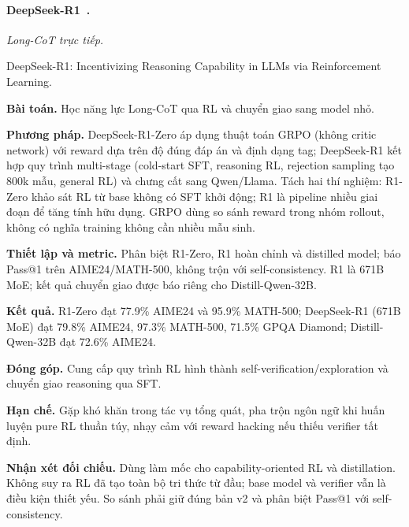 \begin{samepage}
\paragraph{DeepSeek-R1~\cite{rra1_deepseek_r1}.}
\emph{Long-CoT trực tiếp.}\par
{\raggedright\noindent\small DeepSeek-R1: Incentivizing Reasoning Capability in LLMs via Reinforcement Learning.\par}
\noindent\textbf{Bài toán.} Học năng lực Long-CoT qua RL và chuyển giao sang model nhỏ.\par
\end{samepage}
\noindent\textbf{Phương pháp.} DeepSeek-R1-Zero áp dụng thuật toán GRPO (không critic network) với reward dựa trên độ đúng đáp án và định dạng tag; DeepSeek-R1 kết hợp quy trình multi-stage (cold-start SFT, reasoning RL, rejection sampling tạo 800k mẫu, general RL) và chưng cất sang Qwen/Llama. Tách hai thí nghiệm: R1-Zero khảo sát RL từ base không có SFT khởi động; R1 là pipeline nhiều giai đoạn để tăng tính hữu dụng. GRPO dùng so sánh reward trong nhóm rollout, không có nghĩa training không cần nhiều mẫu sinh.\par
\noindent\textbf{Thiết lập và metric.} Phân biệt R1-Zero, R1 hoàn chỉnh và distilled model; báo Pass@1 trên AIME24/MATH-500, không trộn với self-consistency. R1 là 671B MoE; kết quả chuyển giao được báo riêng cho Distill-Qwen-32B.\par
\noindent\textbf{Kết quả.} R1-Zero đạt 77.9\% AIME24 và 95.9\% MATH-500; DeepSeek-R1 (671B MoE) đạt 79.8\% AIME24, 97.3\% MATH-500, 71.5\% GPQA Diamond; Distill-Qwen-32B đạt 72.6\% AIME24.\par
\noindent\textbf{Đóng góp.} Cung cấp quy trình RL hình thành self-verification/exploration và chuyển giao reasoning qua SFT.\par
\noindent\textbf{Hạn chế.} Gặp khó khăn trong tác vụ tổng quát, pha trộn ngôn ngữ khi huấn luyện pure RL thuần túy, nhạy cảm với reward hacking nếu thiếu verifier tất định.\par
\begin{samepage}
\noindent\textbf{Nhận xét đối chiếu.} Dùng làm mốc cho capability-oriented RL và distillation. Không suy ra RL đã tạo toàn bộ tri thức từ đầu; base model và verifier vẫn là điều kiện thiết yếu. So sánh phải giữ đúng bản v2 và phân biệt Pass@1 với self-consistency.\par
{}
\end{samepage}

